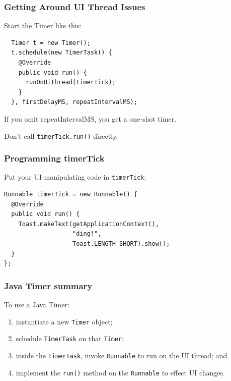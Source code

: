 \begin{frame}[fragile]
\frametitle{Getting Around UI Thread Issues}

\begin{changemargin}{1cm}
Start the Timer like this:

\begin{verbatim}
  Timer t = new Timer();
  t.schedule(new TimerTask() {
    @Override
    public void run() {
      runOnUiThread(timerTick);
    }
  }, firstDelayMS, repeatIntervalMS);
\end{verbatim}
If you omit repeatIntervalMS, you get a one-shot timer.

Don't call {\tt timerTick.run()} directly.
\end{changemargin}

\end{frame}

\begin{frame}[fragile]
\frametitle{Programming timerTick}

\begin{changemargin}{1cm}
Put your UI-manipulating code in {\tt timerTick}:
\begin{verbatim}
Runnable timerTick = new Runnable() {
  @Override
  public void run() {
    Toast.makeText(getApplicationContext(), 
                   "ding!", 
                   Toast.LENGTH_SHORT).show();
  }
};
\end{verbatim}
\end{changemargin}

\end{frame}

\begin{frame}

\frametitle{Java Timer summary}

\begin{changemargin}{1cm}
\large
To use a Java Timer:
\begin{enumerate}
\item instantiate a new {\tt Timer} object;
\item schedule {\tt TimerTask} on that {\tt Timer};
\item inside the {\tt TimerTask}, invoke {\tt Runnable} to run on the
UI thread; and
\item implement the {\tt run()} method on the {\tt Runnable} to effect
  UI changes.  
\end{enumerate}
\end{changemargin}

\end{frame}

